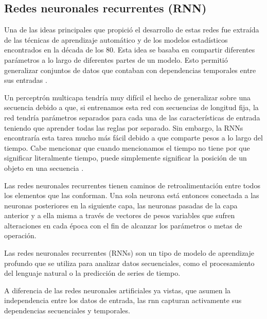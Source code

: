\subsection{Redes neuronales recurrentes (RNN)}

Una de las ideas principales que propició el desarrollo de estas redes fue
extraída de las técnicas de aprendizaje automático y de los modelos
estadísticos encontrados en la década de los 80. Esta idea se basaba en
compartir diferentes parámetros a lo largo de diferentes partes de un modelo. Esto permitió generalizar conjuntos de datos que contaban con dependencias temporales entre sus entradas \cite{Goodfellow-et-al-2016}.

\vspace{1\baselineskip}
Un perceptrón multicapa tendría muy difícil el hecho de generalizar sobre una secuencia debido a que, si entrenamos esta red con secuencias de longitud fija, la red tendría parámetros separados para cada una de las características de entrada teniendo que aprender todas las reglas por separado. Sin embargo, la RNNs encontraría esta tarea mucho más fácil debido a que comparte pesos a lo largo del tiempo. Cabe mencionar que cuando mencionamos el tiempo no tiene por que significar literalmente tiempo, puede simplemente significar la posición de un objeto en una secuencia \cite{roman2018redes}.

\vspace{1\baselineskip}
Las redes neuronales recurrentes tienen caminos de retroalimentación entre
todos los elementos que las conforman. Una sola neurona está entonces conectada a las neuronas posteriores en la siguiente capa, las neuronas pasadas de la capa anterior y a ella misma a través de vectores de pesos variables que sufren alteraciones en cada época con el fin de alcanzar los parámetros o metas de operación\cite{montesdeoca2016estudios}.

\vspace{1\baselineskip}
Las redes neuronales recurrentes (RNNs) son un tipo de modelo de aprendizaje profundo que se utiliza para analizar datos secuenciales, como el procesamiento del lenguaje natural o la predicción de series de
tiempo\cite{tomas2023prediccion}.

\vspace{1\baselineskip}
A diferencia de las redes neuronales artificiales ya vistas, que asumen la
independencia entre los datos de entrada, las \gls{rnn} capturan activamente sus dependencias secuenciales y temporales\cite{arana2021redes}.

